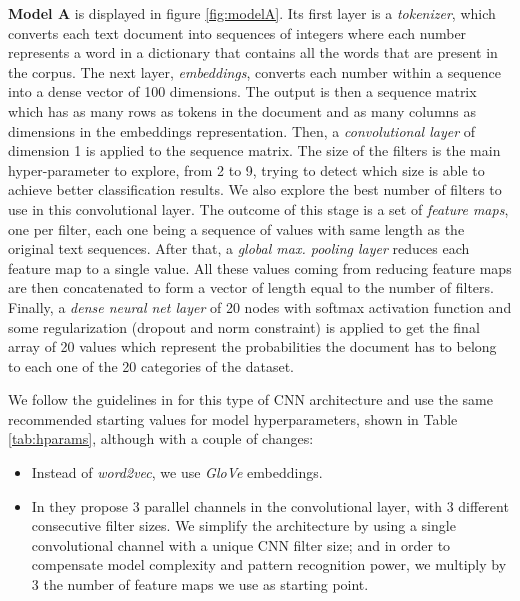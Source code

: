 \documentclass[10pt,journal,compsoc, onecolumn]{IEEEtran}
\begin{document}
\textbf{Model A} is displayed in figure \ref{fig:modelA}. Its first layer  is a \emph{tokenizer}, which converts each text document into sequences of integers where each number represents a word in a dictionary that contains all the words that are present in the corpus. The next layer, \emph{embeddings}, converts each number within a sequence into a dense vector of 100 dimensions. The output is then a sequence matrix which has as many rows as tokens in the document and as many columns as dimensions in the embeddings representation. Then, a \emph{convolutional layer} of dimension 1 is applied to the sequence matrix. The size of the filters is the main hyper-parameter to explore, from 2 to 9, trying to detect which size is able to achieve better classification results. We also explore the best number of filters to use in this convolutional layer. The outcome of this stage is a set of \emph{feature maps}, one per filter, each one being a sequence of values with same length as the original text sequences. After that, a \emph{global max. pooling layer} reduces each feature map to a single value. All these values coming from reducing feature maps are then concatenated to form a vector of length equal to the number of filters. Finally, a \emph{dense neural net layer} of 20 nodes with softmax activation function and some regularization  (dropout and norm constraint) is applied to get the final array of 20 values which represent the probabilities the document has to belong to each one of the 20 categories of the dataset. 

We follow the guidelines in \cite{Zhang} for this type of CNN architecture and use the same recommended starting values for model hyperparameters, shown in Table \ref{tab:hparams}, although with a couple of changes:

\begin{itemize}
    \item Instead of \textit{word2vec}, we use \textit{GloVe} embeddings.
    \item In \cite{Zhang} they propose 3 parallel channels in the convolutional layer, with 3 different consecutive filter sizes. We simplify the architecture by using a single convolutional channel with a unique CNN filter size; and in order to compensate model complexity and pattern recognition power, we multiply by 3 the number of feature maps we use as starting point.
\end{itemize}
\end{document}
